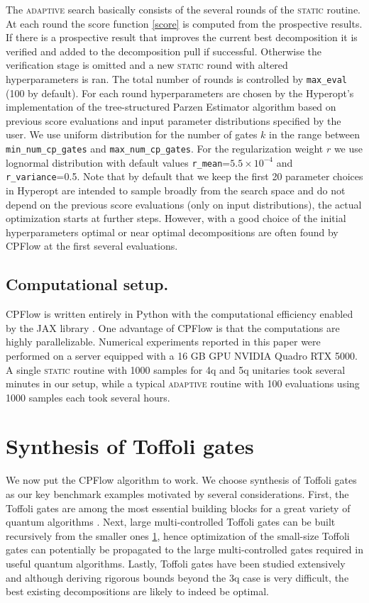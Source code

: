 \documentclass[amsfonts, amssymb, aps, nofootinbib, twocolumn]{revtex4-2}
\newcommand{\package}[1]{\textrm {#1 }}
\newcommand{\cpflow}{\package{CPFlow}}
\newcommand{\static}{\textsc{static }}
\newcommand{\adaptive}{\textsc{adaptive }}
\newcommand{\param}[1]{\texttt{#1}}
\begin{document}
The \adaptive search basically consists of the several rounds of the \static routine. At each round the score function \eqref{score}  is computed from the prospective results. If there is a prospective result that improves the current best decomposition it is verified and added to the decomposition pull if successful. Otherwise the verification stage is omitted and a new \static round with altered hyperparameters is ran. The total number of rounds is controlled by \param{max\_eval} (100 by default). For each round hyperparameters are chosen by the Hyperopt's implementation of the tree-structured Parzen Estimator algorithm \cite{hyperopt} based on previous score evaluations and input parameter distributions specified by the user. We use uniform distribution for the number of gates $k$ in the range between \param{min\_num\_cp\_gates} and \param{max\_num\_cp\_gates}. For the regularization weight $r$ we use lognormal distribution with default values \param{r\_mean}=$5.5\times10^{-4}$ and \param{r\_variance}=0.5. Note that by default that we keep the first 20 parameter choices in Hyperopt are intended to sample broadly from the search space and do not depend on the previous score evaluations (only on input distributions), the actual optimization starts at further steps. However, with a good choice of the initial hyperparameters optimal or near optimal decompositions are often found by \cpflow at the first several evaluations.
\subsection*{Computational setup. \label{server}}
\cpflow is written entirely in Python with the computational efficiency enabled by the \package{JAX} library \cite{jax2018github}. One advantage of \cpflow is that the computations are highly parallelizable. Numerical experiments reported in this paper  were performed on a server equipped with a 16 GB GPU NVIDIA Quadro RTX 5000. A single \static routine with 1000 samples for 4q and 5q unitaries took several minutes in our setup, while a typical \adaptive routine with 100 evaluations using 1000 samples each took several hours. 
\section{Synthesis of Toffoli gates \label{sec toffoli}}
We now put the \cpflow algorithm to work. We choose synthesis of Toffoli gates as our key benchmark examples motivated by several considerations. First, the Toffoli gates are among the most essential building blocks for a great variety of quantum algorithms \cite{}. Next, large multi-controlled Toffoli gates can be built recursively from the smaller ones \ref{}, hence optimization of the small-size Toffoli gates can potentially be propagated to the large multi-controlled gates required in useful quantum algorithms. Lastly, Toffoli gates have been studied extensively \cite{Barenco1995, Song2003, Maslov, Shende2009, Schuch} and although deriving rigorous bounds beyond the 3q case is very difficult, the best existing decompositions are likely to indeed be optimal.
\end{document}
